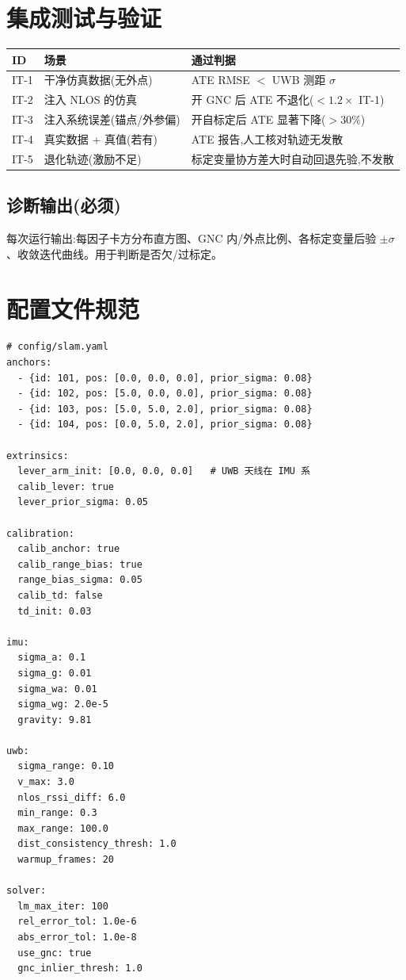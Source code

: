 \documentclass[11pt,a4paper]{report}
\begin{document}
\chapter{集成测试与验证}

\begin{longtable}{l p{4cm} p{6.5cm}}
\toprule
ID & 场景 & 通过判据 \\
\midrule
IT-1 & 干净仿真数据(无外点) & ATE RMSE $<$ UWB 测距 $\sigma$ \\
IT-2 & 注入 NLOS 的仿真 & 开 GNC 后 ATE 不退化($<1.2\times$ IT-1) \\
IT-3 & 注入系统误差(锚点/外参偏) & 开自标定后 ATE 显著下降($>30\%$) \\
IT-4 & 真实数据 + 真值(若有) & ATE 报告,人工核对轨迹无发散 \\
IT-5 & 退化轨迹(激励不足) & 标定变量协方差大时自动回退先验,不发散 \\
\bottomrule
\end{longtable}

\section{诊断输出(必须)}
每次运行输出:每因子卡方分布直方图、GNC 内/外点比例、各标定变量后验 $\pm\sigma$、收敛迭代曲线。用于判断是否欠/过标定。

\chapter{配置文件规范}
\begin{lstlisting}[style=yaml]
# config/slam.yaml
anchors:
  - {id: 101, pos: [0.0, 0.0, 0.0], prior_sigma: 0.08}
  - {id: 102, pos: [5.0, 0.0, 0.0], prior_sigma: 0.08}
  - {id: 103, pos: [5.0, 5.0, 2.0], prior_sigma: 0.08}
  - {id: 104, pos: [0.0, 5.0, 2.0], prior_sigma: 0.08}

extrinsics:
  lever_arm_init: [0.0, 0.0, 0.0]   # UWB 天线在 IMU 系
  calib_lever: true
  lever_prior_sigma: 0.05

calibration:
  calib_anchor: true
  calib_range_bias: true
  range_bias_sigma: 0.05
  calib_td: false
  td_init: 0.03

imu:
  sigma_a: 0.1
  sigma_g: 0.01
  sigma_wa: 0.01
  sigma_wg: 2.0e-5
  gravity: 9.81

uwb:
  sigma_range: 0.10
  v_max: 3.0
  nlos_rssi_diff: 6.0
  min_range: 0.3
  max_range: 100.0
  dist_consistency_thresh: 1.0
  warmup_frames: 20

solver:
  lm_max_iter: 100
  rel_error_tol: 1.0e-6
  abs_error_tol: 1.0e-8
  use_gnc: true
  gnc_inlier_thresh: 1.0
\end{lstlisting}
\end{document}
